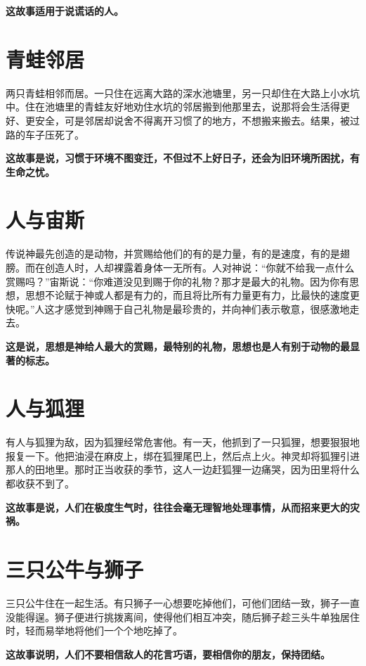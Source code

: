 {\bfseries \color{red}这故事适用于说谎话的人。}

\section{青蛙邻居}

两只青蛙相邻而居。一只住在远离大路的深水池塘里，另一只却住在大路上小水坑中。住在池塘里的青蛙友好地劝住水坑的邻居搬到他那里去，说那将会生活得更好、更安全，可是邻居却说舍不得离开习惯了的地方，不想搬来搬去。结果，被过路的车子压死了。

{\bfseries \color{red}这故事是说，习惯于环境不图变迁，不但过不上好日子，还会为旧环境所困扰，有生命之忧。}

\section{人与宙斯}

传说神最先创造的是动物，并赏赐给他们的有的是力量，有的是速度，有的是翅膀。而在创造人时，人却裸露着身体一无所有。人对神说：“你就不给我一点什么赏赐吗？”宙斯说：“你难道没见到赐于你的礼物？那才是最大的礼物。因为你有思想，思想不论赋于神或人都是有力的，而且将比所有力量更有力，比最快的速度更快呢。”人这才感觉到神赐于自己礼物是最珍贵的，并向神们表示敬意，很感激地走去。

{\bfseries \color{red}这是说，思想是神给人最大的赏赐，最特别的礼物，思想也是人有别于动物的最显著的标志。}

\section{人与狐狸}

有人与狐狸为敌，因为狐狸经常危害他。有一天，他抓到了一只狐狸，想要狠狠地报复一下。他把油浸在麻皮上，绑在狐狸尾巴上，然后点上火。神灵却将狐狸引进那人的田地里。那时正当收获的季节，这人一边赶狐狸一边痛哭，因为田里将什么都收获不到了。

{\bfseries \color{red}这故事是说，人们在极度生气时，往往会毫无理智地处理事情，从而招来更大的灾祸。}

\section{三只公牛与狮子}

三只公牛住在一起生活。有只狮子一心想要吃掉他们，可他们团结一致，狮子一直没能得逞。狮子便进行挑拨离间，使得他们相互冲突，随后狮子趁三头牛单独居住时，轻而易举地将他们一个个地吃掉了。

{\bfseries \color{red}这故事说明，人们不要相信敌人的花言巧语，要相信你的朋友，保持团结。}

